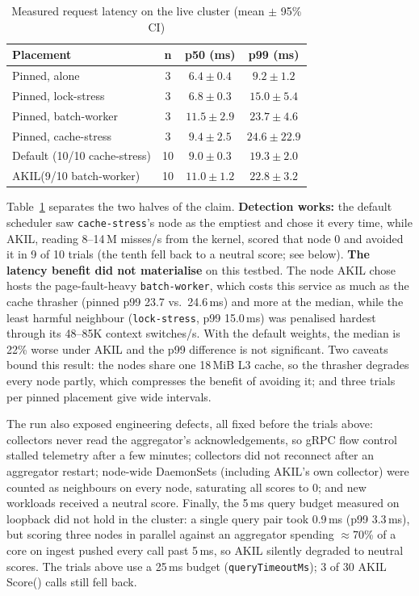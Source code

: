 \documentclass[10pt,conference,a4paper]{IEEEtran}
\newcommand{\akil}{\textsc{AKIL}\xspace}
\newcommand{\sys}{\akil}
\begin{document}
\begin{table}[htbp]
\centering
\caption{Measured request latency on the live cluster (mean $\pm$ 95\% CI)}
\label{tab:live}
\renewcommand{\arraystretch}{1.12}
\begin{tabular}{lccc}
\toprule
\textbf{Placement} & \textbf{n} & \textbf{p50 (ms)} & \textbf{p99 (ms)} \\
\midrule
Pinned, alone             & 3  & $6.4 \pm 0.4$  & $9.2 \pm 1.2$ \\
Pinned, lock-stress       & 3  & $6.8 \pm 0.3$  & $15.0 \pm 5.4$ \\
Pinned, batch-worker      & 3  & $11.5 \pm 2.9$ & $23.7 \pm 4.6$ \\
Pinned, cache-stress      & 3  & $9.4 \pm 2.5$  & $24.6 \pm 22.9$ \\
\midrule
Default (10/10 cache-stress)   & 10 & $9.0 \pm 0.3$  & $19.3 \pm 2.0$ \\
\sys (9/10 batch-worker)      & 10 & $11.0 \pm 1.2$ & $22.8 \pm 3.2$ \\
\bottomrule
\end{tabular}
\end{table}

Table~\ref{tab:live} separates the two halves of the claim. \textbf{Detection works:}
the default scheduler saw \texttt{cache-stress}'s node as the emptiest and chose it every
time, while \sys, reading 8--14\,M misses/s from the kernel, scored that node 0 and
avoided it in 9 of 10 trials (the tenth fell back to a neutral score; see below).
\textbf{The latency benefit did not materialise} on this testbed. The node \sys chose
hosts the page-fault-heavy \texttt{batch-worker}, which costs this service as much as
the cache thrasher (pinned p99 23.7 vs.\ 24.6\,ms) and more at the median, while the
least harmful neighbour (\texttt{lock-stress}, p99 15.0\,ms) was penalised hardest
through its 48--85K context switches/s. With the default weights, the median is 22\%
worse under \sys and the p99 difference is not significant. Two caveats bound this
result: the nodes share one 18\,MiB L3 cache, so the thrasher degrades every node
partly, which compresses the benefit of avoiding it; and three trials per pinned
placement give wide intervals.

The run also exposed engineering defects, all fixed before the trials above: collectors
never read the aggregator's acknowledgements, so gRPC flow control stalled telemetry
after a few minutes; collectors did not reconnect after an aggregator restart;
node-wide DaemonSets (including \sys's own collector) were counted as neighbours on every
node, saturating all scores to 0; and new workloads received a neutral score. Finally,
the 5\,ms query budget measured on loopback did not hold in the cluster: a single query
pair took 0.9\,ms (p99 3.3\,ms), but scoring three nodes in parallel against an aggregator
spending $\approx$70\% of a core on ingest pushed every call past 5\,ms, so \sys
silently degraded to neutral scores. The trials above use a 25\,ms budget
(\texttt{queryTimeoutMs}); 3 of 30 \sys Score() calls still fell back.
\end{document}
